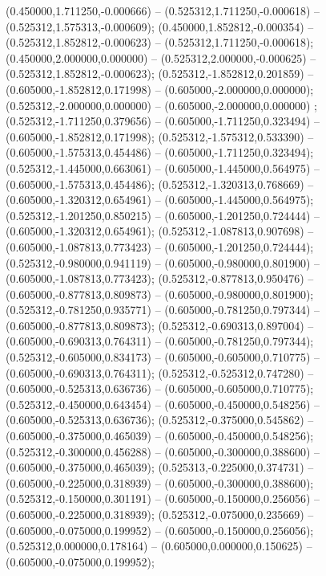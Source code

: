  (0.450000,1.711250,-0.000666) -- (0.525312,1.711250,-0.000618) -- (0.525312,1.575313,-0.000609);
 (0.450000,1.852812,-0.000354) -- (0.525312,1.852812,-0.000623) -- (0.525312,1.711250,-0.000618);
 (0.450000,2.000000,0.000000) -- (0.525312,2.000000,-0.000625) -- (0.525312,1.852812,-0.000623);
 (0.525312,-1.852812,0.201859) -- (0.605000,-1.852812,0.171998) -- (0.605000,-2.000000,0.000000);
 (0.525312,-2.000000,0.000000) -- (0.605000,-2.000000,0.000000) ;
 (0.525312,-1.711250,0.379656) -- (0.605000,-1.711250,0.323494) -- (0.605000,-1.852812,0.171998);
 (0.525312,-1.575312,0.533390) -- (0.605000,-1.575313,0.454486) -- (0.605000,-1.711250,0.323494);
 (0.525312,-1.445000,0.663061) -- (0.605000,-1.445000,0.564975) -- (0.605000,-1.575313,0.454486);
 (0.525312,-1.320313,0.768669) -- (0.605000,-1.320312,0.654961) -- (0.605000,-1.445000,0.564975);
 (0.525312,-1.201250,0.850215) -- (0.605000,-1.201250,0.724444) -- (0.605000,-1.320312,0.654961);
 (0.525312,-1.087813,0.907698) -- (0.605000,-1.087813,0.773423) -- (0.605000,-1.201250,0.724444);
 (0.525312,-0.980000,0.941119) -- (0.605000,-0.980000,0.801900) -- (0.605000,-1.087813,0.773423);
 (0.525312,-0.877813,0.950476) -- (0.605000,-0.877813,0.809873) -- (0.605000,-0.980000,0.801900);
 (0.525312,-0.781250,0.935771) -- (0.605000,-0.781250,0.797344) -- (0.605000,-0.877813,0.809873);
 (0.525312,-0.690313,0.897004) -- (0.605000,-0.690313,0.764311) -- (0.605000,-0.781250,0.797344);
 (0.525312,-0.605000,0.834173) -- (0.605000,-0.605000,0.710775) -- (0.605000,-0.690313,0.764311);
 (0.525312,-0.525312,0.747280) -- (0.605000,-0.525313,0.636736) -- (0.605000,-0.605000,0.710775);
 (0.525312,-0.450000,0.643454) -- (0.605000,-0.450000,0.548256) -- (0.605000,-0.525313,0.636736);
 (0.525312,-0.375000,0.545862) -- (0.605000,-0.375000,0.465039) -- (0.605000,-0.450000,0.548256);
 (0.525312,-0.300000,0.456288) -- (0.605000,-0.300000,0.388600) -- (0.605000,-0.375000,0.465039);
 (0.525313,-0.225000,0.374731) -- (0.605000,-0.225000,0.318939) -- (0.605000,-0.300000,0.388600);
 (0.525312,-0.150000,0.301191) -- (0.605000,-0.150000,0.256056) -- (0.605000,-0.225000,0.318939);
 (0.525312,-0.075000,0.235669) -- (0.605000,-0.075000,0.199952) -- (0.605000,-0.150000,0.256056);
 (0.525312,0.000000,0.178164) -- (0.605000,0.000000,0.150625) -- (0.605000,-0.075000,0.199952);

